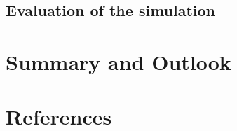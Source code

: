 \documentclass[11pt]{article}
\begin{document}
\subsection{Evaluation of the simulation}

\section{Summary and Outlook}

\section{References}
\end{document}
